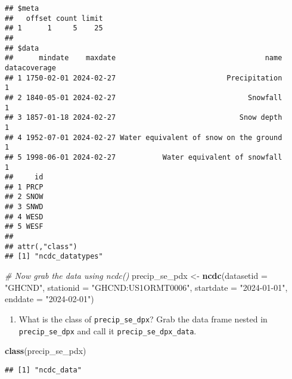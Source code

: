 \documentclass[
]{article}
\newenvironment{Shaded}{\begin{snugshade}}{\end{snugshade}}
\newcommand{\AttributeTok}[1]{\textcolor[rgb]{0.13,0.29,0.53}{#1}}
\newcommand{\CommentTok}[1]{\textcolor[rgb]{0.56,0.35,0.01}{\textit{#1}}}
\newcommand{\FunctionTok}[1]{\textcolor[rgb]{0.13,0.29,0.53}{\textbf{#1}}}
\newcommand{\NormalTok}[1]{#1}
\newcommand{\OtherTok}[1]{\textcolor[rgb]{0.56,0.35,0.01}{#1}}
\newcommand{\SpecialCharTok}[1]{\textcolor[rgb]{0.81,0.36,0.00}{\textbf{#1}}}
\newcommand{\StringTok}[1]{\textcolor[rgb]{0.31,0.60,0.02}{#1}}
\providecommand{\tightlist}{%
  \setlength{\itemsep}{0pt}\setlength{\parskip}{0pt}}
\begin{document}
\begin{verbatim}
## $meta
##   offset count limit
## 1      1     5    25
## 
## $data
##      mindate    maxdate                                   name datacoverage
## 1 1750-02-01 2024-02-27                          Precipitation            1
## 2 1840-05-01 2024-02-27                               Snowfall            1
## 3 1857-01-18 2024-02-27                             Snow depth            1
## 4 1952-07-01 2024-02-27 Water equivalent of snow on the ground            1
## 5 1998-06-01 2024-02-27           Water equivalent of snowfall            1
##     id
## 1 PRCP
## 2 SNOW
## 3 SNWD
## 4 WESD
## 5 WESF
## 
## attr(,"class")
## [1] "ncdc_datatypes"
\end{verbatim}

\begin{Shaded}
\begin{Highlighting}[]
\CommentTok{\# Now grab the data using ncdc()}
\NormalTok{precip\_se\_pdx }\OtherTok{\textless{}{-}} \FunctionTok{ncdc}\NormalTok{(}\AttributeTok{datasetid =} \StringTok{"GHCND"}\NormalTok{,}
               \AttributeTok{stationid =} \StringTok{"GHCND:US1ORMT0006"}\NormalTok{,}
               \AttributeTok{startdate =} \StringTok{"2024{-}01{-}01"}\NormalTok{,}
               \AttributeTok{enddate =} \StringTok{"2024{-}02{-}01"}\NormalTok{)}
\end{Highlighting}
\end{Shaded}

\begin{enumerate}
\def\labelenumi{\alph{enumi}.}
\setcounter{enumi}{3}
\tightlist
\item
  What is the class of \texttt{precip\_se\_dpx}? Grab the data frame
  nested in \texttt{precip\_se\_dpx} and call it
  \texttt{precip\_se\_dpx\_data}.
\end{enumerate}

\begin{Shaded}
\begin{Highlighting}[]
\FunctionTok{class}\NormalTok{(precip\_se\_pdx)}
\end{Highlighting}
\end{Shaded}

\begin{verbatim}
## [1] "ncdc_data"
\end{verbatim}

\begin{Shaded}
\end{Shaded}
\end{document}
